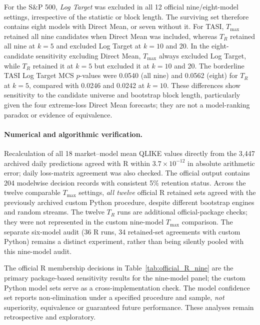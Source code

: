 For the S\&P 500, \emph{Log Target} was excluded in all 12 official nine/eight-model settings, irrespective of the statistic or block length. The surviving set therefore contains eight models with Direct Mean, or seven without it. For TASI, $T_{\max}$ retained all nine candidates when Direct Mean was included, whereas $T_R$ retained all nine at $k=5$ and excluded Log Target at $k=10$ and 20. In the eight-candidate sensitivity excluding Direct Mean, $T_{\max}$ always excluded Log Target, while $T_R$ retained it at $k=5$ but excluded it at $k=10$ and 20. The borderline TASI Log Target MCS $p$-values were 0.0540 (all nine) and 0.0562 (eight) for $T_R$ at $k=5$, compared with 0.0246 and 0.0242 at $k=10$. These differences show sensitivity to the candidate universe and bootstrap block length, particularly given the four extreme-loss Direct Mean forecasts; they are not a model-ranking paradox or evidence of equivalence.

\paragraph{Numerical and algorithmic verification.} Recalculation of all 18 market--model mean QLIKE values directly from the 3,447 archived daily predictions agreed with R within $3.7\times10^{-12}$ in absolute arithmetic error; daily loss-matrix agreement was also checked. The official output contains 204 modelwise decision records with consistent 5\% retention status. Across the twelve comparable $T_{\max}$ settings, \emph{all twelve} official R retained sets agreed with the previously archived custom Python procedure, despite different bootstrap engines and random streams. The twelve $T_R$ runs are additional official-package checks; they were not represented in the custom nine-model $T_{\max}$ comparison. The separate six-model audit (36 R runs, 34 retained-set agreements with custom Python) remains a distinct experiment, rather than being silently pooled with this nine-model audit.

The official R membership decisions in Table~\ref{tab:official_R_nine} are the primary package-based sensitivity results for the nine-model panel; the custom Python model sets serve as a cross-implementation check. The model confidence set reports non-elimination under a specified procedure and sample, \emph{not} superiority, equivalence or guaranteed future performance. These analyses remain retrospective and exploratory.

